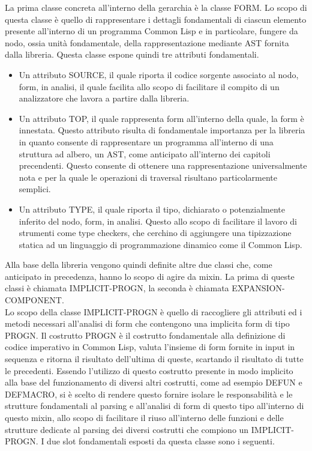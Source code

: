 La prima classe concreta all’interno della gerarchia è la classe FORM. Lo
scopo di questa classe è quello di rappresentare i dettagli fondamentali di
ciascun elemento presente all’interno di un programma Common Lisp e in
particolare, fungere da nodo, ossia unità fondamentale, della rappresentazione
mediante AST fornita dalla libreria. Questa classe espone quindi tre attributi
fondamentali.\\

\begin{itemize}

\item Un attributo SOURCE, il quale riporta il codice sorgente associato al
nodo, form, in analisi, il quale facilita allo scopo di facilitare il compito
di un analizzatore che lavora a partire dalla libreria.

\item Un attributo TOP,  il quale rappresenta form all’interno della quale, la
form è innestata. Questo attributo risulta di fondamentale importanza per la
libreria in quanto consente di rappresentare un programma all’interno di una
struttura ad albero, un AST, come anticipato all’interno dei capitoli
precendenti. Questo consente di ottenere una rappresentazione universalmente
nota e per la quale le operazioni di traversal risultano particolarmente
semplici.

\item Un attributo TYPE, il quale riporta il tipo, dichiarato o potenzialmente
inferito del nodo, form, in analisi. Questo allo scopo di facilitare il lavoro
di strumenti come type checkers, che cerchino di aggiungere una tipizzazione
statica ad un linguaggio di programmazione dinamico come il Common Lisp.\\

\end{itemize}



Alla base della libreria vengono quindi definite altre due classi che, come
anticipato in precedenza, hanno lo scopo di agire da mixin. La prima di queste
classi è chiamata IMPLICIT-PROGN, la seconda è chiamata EXPANSION-COMPONENT.\\

Lo scopo della classe IMPLICIT-PROGN è quello di raccogliere gli attributi ed
i metodi necessari all’analisi di form che contengono una implicita form di
tipo PROGN. Il costrutto PROGN è il costrutto fondamentale alla definizione di
codice imperativo in Common Lisp, valuta l’insieme di form fornite in input in
sequenza e ritorna il risultato dell’ultima di queste, scartando il risultato
di tutte le precedenti. Essendo l’utilizzo di questo costrutto presente in
modo implicito alla base del funzionamento di diversi altri costrutti, come ad
esempio DEFUN e DEFMACRO, si è scelto di rendere questo fornire isolare le
responsabilità e le strutture fondamentali al parsing e all’analisi di form di
questo tipo all’interno di questo mixin, allo scopo di facilitare il riuso
all’interno delle funzioni e delle strutture dedicate al parsing dei diversi
costrutti che compiono un IMPLICIT-PROGN. I due slot fondamentali esposti da
questa classe sono i seguenti.\\

